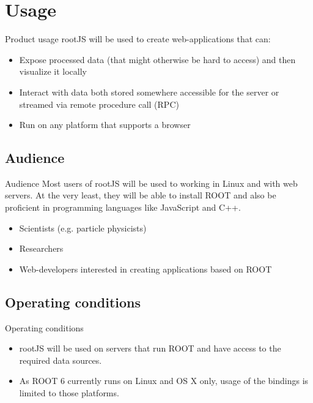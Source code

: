 \section{Usage}
\begin{frame}{Product usage}
        rootJS will be used to create web-applications that can:
        \begin{itemize}
        	\item Expose processed data (that might otherwise be hard to access) and then visualize it locally
        	\item Interact with data both stored somewhere accessible for the server or streamed via remote procedure call (RPC)
        	\item Run on any platform that supports a browser
        \end{itemize}
\end{frame}


\subsection{Audience}
\begin{frame}{Audience}
        Most users of rootJS will be used to working in Linux and with web servers. At the very least, they will be able to install ROOT
        and also be proficient in programming languages like JavaScript and C++.
        \begin{itemize}
        	\item Scientists (e.g. particle physicists)
        	\item Researchers
        	\item Web-developers interested in creating applications based on ROOT
        \end{itemize}
\end{frame}

\subsection{Operating conditions}
\begin{frame}{Operating conditions}
        \begin{itemize}
                \item rootJS will be used on servers that run ROOT and have access to the required data sources.
                \item As ROOT 6 currently runs on Linux and OS X only, usage of the bindings is limited to those platforms.
        \end{itemize}
\end{frame}

